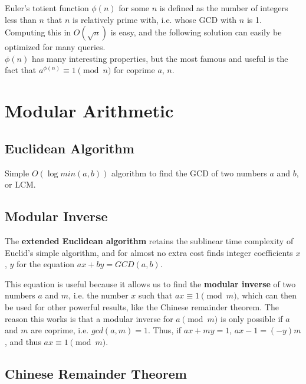 \documentclass[../main]{subfiles}
\begin{document}
    Euler's totient function $\phi(n)$ for some $n$ is defined as the number of integers less than $n$ that $n$ is relatively prime with, i.e. whose GCD with $n$ is 1. Computing this in $O(\sqrt{n})$ is easy, and the following solution can easily be optimized for many queries.\\

    $\phi(n)$ has many interesting properties, but the most famous and useful is the fact that $a^{\phi(n)} \equiv 1 \pmod{n}$ for coprime $a$, $n$.


\section{Modular Arithmetic}

    \subsection{Euclidean Algorithm}

    Simple $O(\log{min(a, b)})$ algorithm to find the GCD of two numbers $a$ and $b$, or LCM.


    \subsection{Modular Inverse}

    The \textbf{extended Euclidean algorithm} retains the sublinear time complexity of Euclid's simple algorithm, and for almost no extra cost finds integer coefficients $x$, $y$ for the equation $ax + by = GCD(a, b)$.
    

    This equation is useful because it allows us to find the \textbf{modular inverse} of two numbers $a$ and $m$, i.e. the number $x$ such that $ax \equiv 1 \pmod{m}$, which can then be used for other powerful results, like the Chinese remainder theorem. The reason this works is that a modular inverse for $a \pmod{m}$ is only possible if $a$ and $m$ are coprime, i.e. $gcd(a, m) = 1$. Thus, if $ax + my = 1$, $ax - 1 = (-y)m$, and thus $ax \equiv 1 \pmod{m}$.



    \subsection{Chinese Remainder Theorem}
\end{document}
